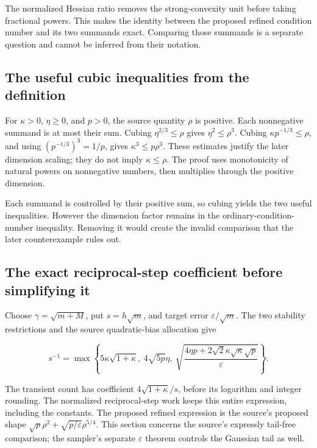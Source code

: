 \documentclass[11pt,a4paper]{report}
\begin{document}
The normalized Hessian ratio removes the strong-convexity unit before taking fractional powers. This makes the identity between the proposed refined condition number and its two summands exact. Comparing those summands is a separate question and cannot be inferred from their notation.

\subsection{\texorpdfstring{The useful cubic inequalities from the definition}{The useful cubic inequalities from the definition}}
\label{report-step-KineticLangevin-ConditionNumber-lean-2}


For \(\kappa>0\), \(\eta\ge0\), and \(p>0\), the source quantity \(\rho\) is positive. Each nonnegative summand is at most their sum. Cubing \(\eta^{2/3}\le\rho\) gives \(\eta^2\le\rho^3\). Cubing \(\kappa p^{-1/3}\le\rho\), and using \((p^{-1/3})^3=1/p\), gives \(\kappa^3\le p\rho^3\). These estimates justify the later dimension scaling; they do not imply \(\kappa\le\rho\). The proof uses monotonicity of natural powers on nonnegative numbers, then multiplies through the positive dimension.



Each summand is controlled by their positive sum, so cubing yields the two useful inequalities. However the dimension factor remains in the ordinary-condition-number inequality. Removing it would create the invalid comparison that the later counterexample rules out.

\subsection{\texorpdfstring{The exact reciprocal-step coefficient before simplifying it}{The exact reciprocal-step coefficient before simplifying it}}
\label{report-step-KineticLangevin-ConditionNumber-lean-3}


Choose \(\gamma=\sqrt{m+M}\), put \(s=h\sqrt m\), and target error \(\varepsilon/\sqrt m\). The two stability restrictions and the source quadratic-bias allocation give

\[s^{-1}=\max\left\{5\kappa\sqrt{1+\kappa},\ 4\sqrt{5p}\eta,\ \sqrt{\frac{4\eta p+2\sqrt2\kappa\sqrt\kappa\sqrt p}{\varepsilon}}\right\}.\]

The transient count has coefficient \(4\sqrt{1+\kappa}/s\), before its logarithm and integer rounding. The normalized reciprocal-step work keeps this entire expression, including the constants. The proposed refined expression is the source's proposed shape \(\sqrt p\rho^2+\sqrt{p/\varepsilon}\rho^{5/4}\). This section concerns the source's expressly tail-free comparison; the sampler's separate \(\varepsilon\) theorem controls the Gaussian tail as well.
\end{document}
